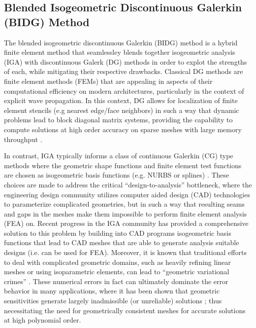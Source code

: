 \subsection{Blended Isogeometric Discontinuous Galerkin (BIDG) Method}
\label{sec:isogeometric}

The blended isogeometric discontinuous Galerkin (BIDG) method is a hybrid finite element method that seamlessley blends together isogeometric analysis (IGA) with discontinuous Galerk (DG) methods in order to explot the strengths of each, while mitigating their respective drawbacks. Classical DG methods are finite element methods (FEMs) that are appealing in
aspects of their computational efficiency on modern architectures,
particularly in the context of explicit wave propagation.  In this context, DG allows for localization of
finite element stencils (e.g nearest edge/face neighbors) in such a way that dynamic problems lead to block
diagonal matrix systems, providing the capability to compute solutions at high order accuracy on sparse meshes with large memory throughput \cite{Klockner20097863}.

In contrast, IGA typically informs a class of continuous Galerkin (CG) type methods where the geometric shape functions and finite element test functions are chosen as isogeometric basis functions (e.g. NURBS or splines) \cite{Riesenfeld20151054}.  These choices are made to address the critical ``design-to-analysis'' bottleneck, where the engineering design community utilizes computer aided design (CAD) technologies to parameterize complicated geometries, but in such a way that resulting seams and gaps in the meshes make them impossible to perform finite element analysis (FEA) on.  Recent progress in the IGA community has provided a comprehensive solution to this problem by building into CAD programs isogeometric basis functions that lead to CAD meshes that are able to generate analysis suitable designs (i.e. can be used for FEA).  Moreover, it is known that traditional efforts to deal with complicated geometric domains, such as heavily refining linear meshes or using isoparametric elements, can lead to ``geometric variational crimes'' \cite{Michoski2016658}.    These numerical errors in fact can ultimately dominate the error behavior in many applications, where it has been shown that geometric sensitivities generate largely inadmissible (or unreliable) solutions \cite{Wirasaet2015597,Fahs:2011:IAH:2003056.2003066,Toulorge_a2d}; thus necessitating the need for geometrically consistent meshes for accurate solutions at high polynomial order.


